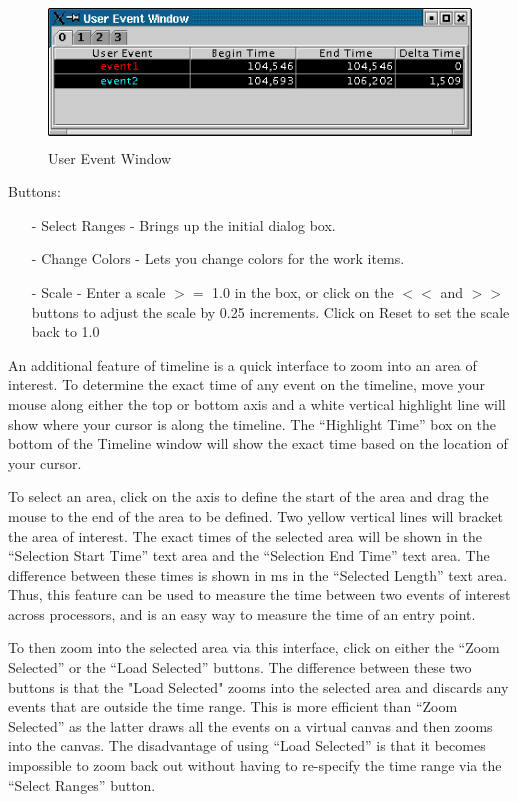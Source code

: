 \documentclass[10pt]{article}
\begin{document}
\begin{enumerate}
\begin{itemize}
   \begin{figure}[htb]
   \center
   \includegraphics[height=1.5in]{fig/userevent}
   \caption{User Event Window}
   \label{userevent}
   \end{figure}

   \end{itemize}

Buttons:
   \begin{itemize}
   \item[-]
   Select Ranges - Brings up the initial dialog box.
   \item[-]
   Change Colors - Lets you change colors for the work items.
   \item[-]
   Scale - Enter a scale $>=$ 1.0 in the box, or click on the $<<$ and
   $>>$ buttons to adjust the scale by 0.25 increments.  Click on
   Reset to set the scale back to 1.0
   \end{itemize}
\end{enumerate}

An additional feature of timeline is a quick interface to zoom into an
area of interest. To determine the exact time of any event on the
timeline, move your mouse along either the top or bottom axis and a
white vertical highlight line will show where your cursor is along the
timeline. The ``Highlight Time'' box on the bottom of the Timeline
window will show the exact time based on the location of your cursor.

To select an area, click on the axis to define the start of the area
and drag the mouse to the end of the area to be defined.  Two yellow
vertical lines will bracket the area of interest.  The exact times of
the selected area will be shown in the ``Selection Start Time'' text
area and the ``Selection End Time'' text area.  The difference between
these times is shown in ms in the ``Selected Length'' text area.  Thus,
this feature can be used to measure the time between two events of
interest across processors, and is an easy way to measure the time of
an entry point.

To then zoom into the selected area via this interface, click on
either the ``Zoom Selected'' or the ``Load Selected'' buttons.  The
difference between these two buttons is that the "Load Selected" zooms
into the selected area and discards any events that are outside the
time range.  This is more efficient than ``Zoom Selected'' as the
latter draws all the events on a virtual canvas and then zooms into
the canvas. The disadvantage of using ``Load Selected'' is that it
becomes impossible to zoom back out without having to re-specify the
time range via the ``Select Ranges'' button.
\end{document}
